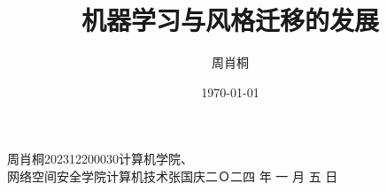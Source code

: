 \documentclass[a4paper]{nuist}
\title{机器学习与风格迁移的发展}
\author{
    周肖桐 \\
}
\date{\today}
\begin{document}
{周肖桐}{202312200030}{计算机学院、\\网络空间安全学院}{计算机技术}{张国庆}{二Ｏ二四\hspace{0.4em} 年\hspace{0.4em} 一\hspace{0.4em} 月\hspace{0.4em} 五\hspace{0.4em} 日}

\tableofcontents
\newpage








    
\end{document}
